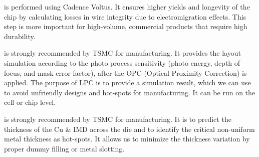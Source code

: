 \begin{cbxlist}{1.5em}{0em}{0.5em}
  \item {} is performed using Cadence Voltus.
     It ensures higher yields and longevity of the chip by calculating
     losses in wire integrity due to electromigration effects. This step
     is more important for high-volume, commercial products that require
     high durability.

  \item {} is strongly
     recommended by TSMC for manufacturing. It provides the layout
     simulation according to the photo process sensitivity (photo energy,
     depth of focus, and mask error factor), after the OPC (Optical
     Proximity Correction) is applied. The purpose of LPC is to provide a
     simulation result, which we can use to avoid unfriendly designs and
     hot-spots for manufacturing. It can be run on the cell or chip
     level.

  \item {}
     is strongly recommended by TSMC for manufacturing. It is to predict
     the thickness of the Cu \& IMD across the die and to identify the
     critical non-uniform metal thickness as hot-spots. It allows us to
     minimize the thickness variation by proper dummy filling or metal
     slotting.

\end{cbxlist}
